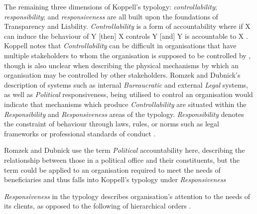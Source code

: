 The remaining three dimensions of Koppell's typology: \textit{controllability}; \textit{responsibility}; and \textit{responsiveness} are all built upon the foundations of Transparency and Liability. \textit{Controllability} is a form of accountability where if X can induce the behaviour of Y [then] X controls Y [and] Y is accountable to X \cite{koppell_pathologies_2005}. Koppell notes that \textit{Controllability} can be difficult in organisations that have multiple stakeholders to whom the organisation is supposed to be controlled by \citep{koppell_pathologies_2005}, though is also unclear when describing the physical mechanisms by which an organisation may be controlled by other stakeholders. Romzek and Dubnick's description of systems such as internal \textit{Bureaucratic} and external \textit{Legal} systems, as well as \textit{Political} responsiveness, being utilised to control an organisation \cite{romzek_accountability_1987} would indicate that mechanisms which produce \textit{Controllability} are situated within the \textit{Responsibility} and \textit{Responsiveness} areas of the typology. \textit{Responsibility} denotes the constraint of behaviour through laws, rules, or norms such as legal frameworks or professional standards of conduct \cite{romzek_accountability_1987, koppell_pathologies_2005}.





Romzek and Dubnick use the term \textit{Political} accountability here, describing the relationship between those in a political office and their constituents, but the term could be applied to an organisation required to meet the needs of beneficiaries and thus falls into Koppell's typology under \textit{Responsiveness}

\textit{Responsiveness} in the typology describes organisation's attention to the needs of its clients, as opposed to the following of hierarchical orders \cite{koppell_pathologies_2005}.

